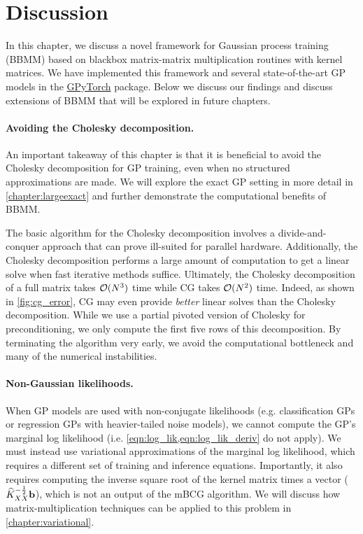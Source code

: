 \section{Discussion}
In this chapter, we discuss a novel framework for Gaussian process training (BBMM) based on blackbox matrix-matrix multiplication routines with kernel matrices.
We have implemented this framework and several state-of-the-art GP models in the {\href{https://gpytorch.ai}{GPyTorch}} package.
Below we discuss our findings and discuss extensions of BBMM that will be explored in future chapters.

\paragraph{Avoiding the Cholesky decomposition.}
An important takeaway of this chapter is that it is beneficial to avoid the Cholesky decomposition for GP training, even when no structured approximations are made.
We will explore the exact GP setting in more detail in \cref{chapter:largeexact} and further demonstrate the computational benefits of BBMM.

The basic algorithm for the Cholesky decomposition involves a divide-and-conquer approach that can prove ill-suited for parallel hardware.
Additionally, the Cholesky decomposition performs a large amount of computation to get a linear solve when fast iterative methods suffice.
Ultimately, the Cholesky decomposition of a full matrix takes $\bigo{N^3}$ time while CG takes $\bigo{N^2}$ time.
Indeed, as shown in \cref{fig:cg_error}, CG may even provide \emph{better} linear solves than the Cholesky decomposition.
While we use a partial pivoted version of Cholesky for preconditioning, we only compute the first five rows of this decomposition.
By terminating the algorithm very early, we avoid the computational bottleneck and many of the numerical instabilities.

\paragraph{Non-Gaussian likelihoods.}
When GP models are used with non-conjugate likelihoods (e.g. classification GPs or regression GPs with heavier-tailed noise models), we cannot compute the GP's marginal log likelihood (i.e. \cref{eqn:log_lik,eqn:log_lik_deriv} do not apply).
We must instead use variational approximations of the marginal log likelihood, which requires a different set of training and inference equations.
Importantly, it also requires computing the inverse square root of the kernel matrix times a vector ($\widehat{K}_{XX}^{- \frac 1 2} \mathbf{b}$), which is not an output of the mBCG algorithm.
We will discuss how matrix-multiplication techniques can be applied to this problem in \cref{chapter:variational}.

